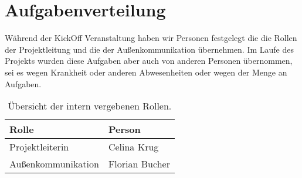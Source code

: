 \chapter{Aufgabenverteilung}

    Während der KickOff Veranstaltung haben wir Personen festgelegt die die Rollen der Projektleitung und die der Außenkommunikation übernehmen. Im Laufe des Projekts wurden diese Aufgaben aber auch von anderen Personen übernommen, sei es wegen Krankheit oder anderen Abwesenheiten oder wegen der Menge an Aufgaben.

    \begin{table}[H]
        \centering
        \begin{tabularx}{\textwidth}{ | l | X | }
            \hline
                \textbf{Rolle} & \textbf{Person} \\
            \hline
                Projektleiterin & Celina Krug \\ 
            \hline
                Außenkommunikation & Florian Bucher \\ 
            \hline
        \end{tabularx}
        \caption{Übersicht der intern vergebenen Rollen.}
        \label{table:roles}
    \end{table}

